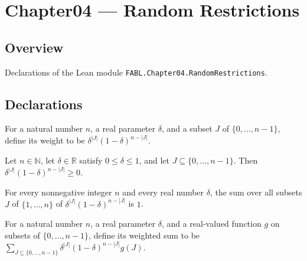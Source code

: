 \chapter{Chapter04 — Random Restrictions}
\section{Overview}

Declarations of the Lean module \texttt{FABL.Chapter04.RandomRestrictions}.

\section{Declarations}

\begin{definition}
\label{FABL.deltaRandomSubsetWeight}
\leanok
For a natural number $n$, a real parameter $\delta$, and a subset $J$ of
$\{0,\ldots,n-1\}$, define its weight to be $\delta^{|J|}(1-\delta)^{n-|J|}$.
\end{definition}

\begin{theorem}
\label{FABL.deltaRandomSubsetWeight_nonneg}
\leanok
{}
Let $n\in\mathbb{N}$, let $\delta\in\mathbb{R}$ satisfy $0\le\delta\le1$, and let
$J\subseteq\{0,\ldots,n-1\}$. Then $\delta^{|J|}(1-\delta)^{n-|J|}\ge0$.
\end{theorem}

\begin{theorem}
\label{FABL.sum_deltaRandomSubsetWeight}
\leanok
{}
For every nonnegative integer $n$ and every real number $\delta$, the sum over all
subsets $J$ of $\{1,\ldots,n\}$ of $\delta^{|J|}(1-\delta)^{n-|J|}$ is $1$.
\end{theorem}

\begin{definition}
\label{FABL.expectDeltaRandomSubset}
\leanok
{}
For a natural number $n$, a real parameter $\delta$, and a real-valued function $g$ on
subsets of $\{0,\ldots,n-1\}$, define its weighted sum to be
$\sum_{J\subseteq\{0,\ldots,n-1\}}\delta^{|J|}(1-\delta)^{n-|J|}g(J)$.
\end{definition}

